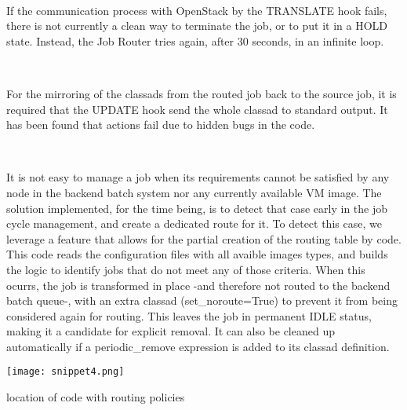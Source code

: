 \documentclass[a4paper]{jpconf}
\begin{document}
~

If the communication process with OpenStack by the TRANSLATE hook fails, 
there is not currently a clean way to terminate the job, or to put it in a HOLD
state. Instead, the Job Router tries again, after 30 seconds, in an infinite loop.

~

For the mirroring of the classads from the routed job back to the source job, 
it is required that the UPDATE hook send the whole classad to standard output. 
It has been found that actions fail due to hidden bugs in the code. 

~

It is not easy to manage a job when its requirements cannot be satisfied by any
node in the backend batch system nor any currently available VM image. 
The solution implemented, for the time being, is to detect that case early in
the job cycle management, and create a dedicated route for it. 
To detect this case, we leverage a feature that allows for the partial creation of the routing table by code.
This code reads the configuration files with all avaible images types, and builds the logic to identify jobs that do not meet any of those criteria. 
When this ocurrs, the job is transformed in place -and therefore not routed to
the backend batch queue-, with an extra classad (set\_noroute=True) to prevent it from being considered again for routing.
This leaves the job in permanent IDLE status, making it a candidate for
explicit removal. It can also be cleaned up automatically if a
periodic\_remove expression is added to its classad definition.

\begin{snippet}[h]
    \centering
    \renewcommand\figurename{Snippet}
    \texttt{[image: snippet4.png]}
    \caption{location of code with routing policies}
    \label{snip:snippet4}
\end{snippet}

\end{document}
